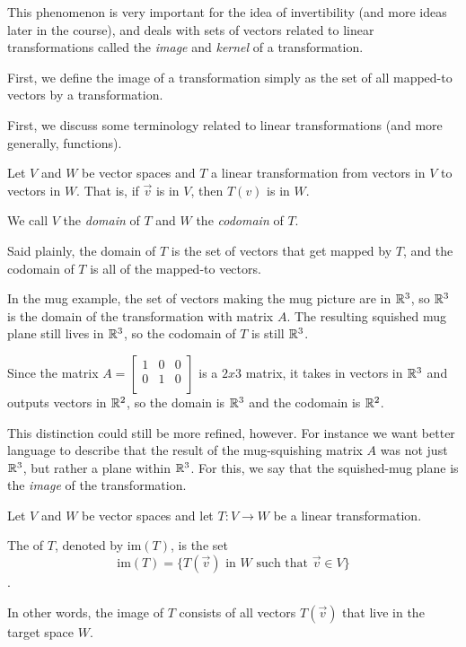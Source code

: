 \documentclass{ximera}
\begin{document}
This phenomenon is very important for the idea of invertibility (and more ideas later in the course), and deals with sets of vectors related to linear transformations called the \emph{image} and \emph{kernel} of a transformation.

First, we define the image of a transformation simply as the set of all mapped-to vectors by a transformation.

First, we discuss some terminology related to linear transformations (and more generally, functions). 

\begin{definition}
  Let $V$ and $W$ be vector spaces and $T$ a linear transformation from vectors in $V$ to vectors in $W$. That is, if $\vec{v}$ is in $V$, then $T(v)$ is in $W$.

  We call $V$ the \emph{domain} of $T$ and $W$ the \emph{codomain} of $T$.
\end{definition}

Said plainly, the domain of $T$ is the set of vectors that get mapped by $T$, and the codomain of $T$ is all of the mapped-to vectors. 

In the mug example, the set of vectors making the mug picture are in $\mathbb{R}^3$, so $\mathbb{R}^3$ is the domain of the transformation with matrix $A$. The resulting squished mug plane still lives in $\mathbb{R}^3$, so the codomain of $T$ is still $\mathbb{R}^3$. 

Since the matrix $A=\begin{bmatrix}
  1&0&0\\
  0&1&0\\
\end{bmatrix}$ is a $2x3$ matrix, it takes in vectors in $\mathbb{R}^3$ and outputs vectors in $\mathbb{R}^2$, so the domain is $\mathbb{R}^3$ and the codomain is $\mathbb{R}^2$.

This distinction could still be more refined, however. For instance we want better language to describe that the result of the mug-squishing matrix $A$ was not just $\mathbb{R}^3$, but rather a plane within $\mathbb{R}^3$. For this, we say that the squished-mug plane is the \emph{image} of the transformation.

\begin{definition}\label{def:imageofT}
Let $V$ and $W$ be vector spaces and let $T:V\rightarrow W$ be a linear transformation.  

The  of $T$, denoted by $\mbox{im}(T)$, is the set
$$\mbox{im}(T)=\{T(\vec{v})\text{ in }W\text{ such that }\vec{v}\in V\}$$.

In other words, the image of $T$ consists of all vectors $T(\vec{v})$ that live in the target space $W$.
\end{definition}
\end{document}
